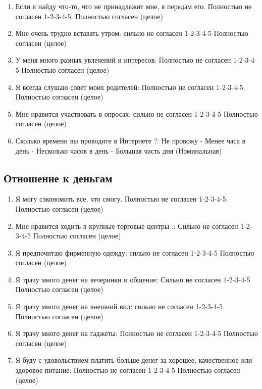 \documentclass[11pt]{article}
\begin{document}
\begin{enumerate}
\item Если я найду что-то, что не принадлежит мне, я передам его. Полностью не согласен 1-2-3-4-5. Полностью согласен (целое)
\item Мне очень трудно вставать утром: сильно не согласен 1-2-3-4-5 Полностью согласен (целое)
\item У меня много разных увлечений и интересов: Полностью не согласен 1-2-3-4-5 Полностью согласен (целое)
\item Я всегда слушаю совет моих родителей: Полностью не согласен 1-2-3-4-5. Полностью согласен (целое)
\item Мне нравится участвовать в опросах: сильно не согласен 1-2-3-4-5 Полностью согласен (целое)
\item Сколько времени вы проводите в Интернете ?: Не провожу - Менее часа в день - Несколько часов в день - Большая часть дня (Номинальная)
\end{enumerate}
\subsection{Отношение к деньгам}
\begin{enumerate}
\item Я могу сэкономить все, что смогу. Полностью не согласен 1-2-3-4-5. Полностью согласен (целое)
\item Мне нравится ходить в крупные торговые центры .: Сильно не согласен 1-2-3-4-5 Полностью согласен (целое)
\item Я предпочитаю фирменную одежду: сильно не согласен 1-2-3-4-5 Полностью согласен (целое)
\item Я трачу много денег на вечеринки и общение: Сильно не согласен 1-2-3-4-5 Полностью согласен (целое)
\item Я трачу много денег на внешний вид: сильно не согласен 1-2-3-4-5 Полностью согласен (целое)
\item Я трачу много денег на гаджеты: Полностью не согласен 1-2-3-4-5 Полностью согласен (целое)
\item Я буду с удовольствием  платить больше денег за хорошее, качественное или здоровое питание: Полностью не согласен 1-2-3-4-5 Полностью согласен (целое)
\end{enumerate}
\end{document}
